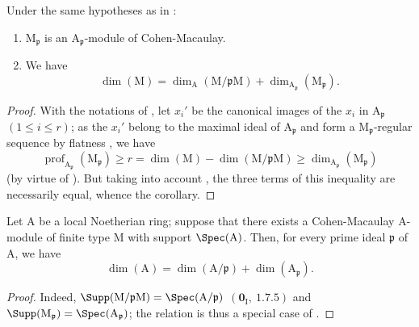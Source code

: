 \begin{corollary}[16.5.10]
\label{0.16.5.10}
Under the same hypotheses as in :
\begin{enumerate}
  \item[\rm{(i)}] $\mathrm{M}_\mathfrak{p}$ is an $\mathrm{A}_\mathfrak{p}$-module of Cohen-Macaulay.
  \item[\rm{(ii)}] We have
  \begin{equation}
  \label{0.16.5.10.1}
  \tag{16.5.10.1}
    \dim(\mathrm{M})=\dim_\mathrm{A}(\mathrm{M}/\mathfrak{p}\mathrm{M})+\dim_{\mathrm{A}_\mathfrak{p}}(\mathrm{M}_\mathfrak{p}).
  \end{equation}
\end{enumerate}
\end{corollary}

\begin{proof}
With the notations of , let $x_i'$ be the canonical images of the $x_i$ in $\mathrm{A}_\mathfrak{p}$ $(1\leq i\leq r)$; as the $x_i'$ belong to the maximal ideal of $\mathrm{A}_\mathfrak{p}$ and form a $\mathrm{M}_\mathfrak{p}$-regular sequence by flatness , we have
\[
  \operatorname{prof}_{\mathrm{A}_\mathfrak{p}}(\mathrm{M}_\mathfrak{p})\geq r=\dim(\mathrm{M})-\dim(\mathrm{M}/\mathfrak{p}\mathrm{M})\geq\dim_{\mathrm{A}_\mathfrak{p}}(\mathrm{M}_\mathfrak{p})
\]
(by virtue of ).
But taking into account , the three terms of this inequality are necessarily equal, whence the corollary.
\end{proof}


\begin{corollary}[16.5.11]
\label{0.16.5.11}
Let $\mathrm{A}$ be a local Noetherian ring; suppose that there exists a Cohen-Macaulay $\mathrm{A}$-module of finite type $\mathrm{M}$ with support $\Spec(\mathrm{A})$.
Then, for every prime ideal $\mathfrak{p}$ of $\mathrm{A}$, we have
\begin{equation}
\label{0.16.5.11.1}
\tag{16.5.11.1}
  \dim(\mathrm{A})=\dim(\mathrm{A}/\mathfrak{p})+\dim(\mathrm{A}_\mathfrak{p}).
\end{equation}
\end{corollary}

\begin{proof}
Indeed, $\Supp(\mathrm{M}/\mathfrak{p}\mathrm{M})=\Spec(\mathrm{A}/\mathfrak{p})$ $(\mathbf{0}_\mathrm{I},~1.7.5)$ and $\Supp(\mathrm{M}_\mathfrak{p})=\Spec(\mathrm{A}_\mathfrak{p})$; the relation  is thus a special case of .
\end{proof}

